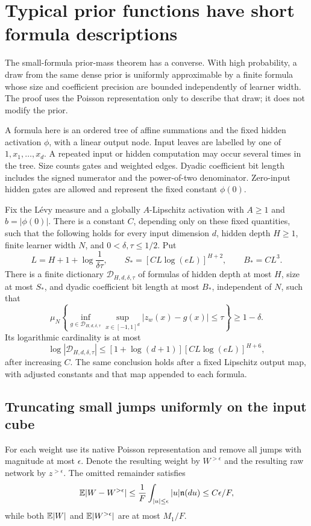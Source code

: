 \section{Typical prior functions have short formula descriptions}
\label{sec:levy-function-compression}
The small-formula prior-mass theorem has a converse. With high probability, a draw from the same dense prior is uniformly approximable by a finite formula whose size and coefficient precision are bounded independently of learner width. The proof uses the Poisson representation only to describe that draw; it does not modify the prior.

A formula here is an ordered tree of affine summations and the fixed hidden activation $\phi$, with a linear output node. Input leaves are labelled by one of $1,x_1,\ldots,x_d$. A repeated input or hidden computation may occur several times in the tree. Size counts gates and weighted edges. Dyadic coefficient bit length includes the signed numerator and the power-of-two denominator. Zero-input hidden gates are allowed and represent the fixed constant $\phi(0)$.

\begin{theorem}
\label{thm:levy-prior-compression}
Fix the L\'evy measure and a globally $A$-Lipschitz activation with $A\ge1$ and $b=|\phi(0)|$. There is a constant $C$, depending only on these fixed quantities, such that the following holds for every input dimension $d$, hidden depth $H\ge1$, finite learner width $N$, and $0<\delta,\tau\le1/2$. Put
\[
 L=H+1+\log\frac1{\delta\tau},\qquad
 S_*=[CL\log(eL)]^{H+2},\qquad B_*=CL^3.
\]
There is a finite dictionary $\mathcal D_{H,d,\delta,\tau}$ of formulas of hidden depth at most $H$, size at most $S_*$, and dyadic coefficient bit length at most $B_*$, independent of $N$, such that
\[
 \mu_N\left\{\inf_{g\in\mathcal D_{H,d,\delta,\tau}}
          \sup_{x\in[-1,1]^d}|z_w(x)-g(x)|\le\tau\right\}
 \ge1-\delta.
\]
Its logarithmic cardinality is at most
\[
 \log|\mathcal D_{H,d,\delta,\tau}|
       \le[1+\log(d+1)][CL\log(eL)]^{H+6},
\]
after increasing $C$. The same conclusion holds after a fixed Lipschitz output map, with adjusted constants and that map appended to each formula.
\end{theorem}

\subsection{Truncating small jumps uniformly on the input cube}
For each weight use its native Poisson representation and remove all jumps with magnitude at most $\epsilon$. Denote the resulting weight by $W^{>\epsilon}$ and the resulting raw network by $z^{>\epsilon}$. The omitted remainder satisfies
\[
 \mathbb E|W-W^{>\epsilon}|
 \le\frac1F\int_{|u|\le\epsilon}|u|\mathfrak n(du)
 \le C\epsilon/F,
\]
while both $\mathbb E|W|$ and $\mathbb E|W^{>\epsilon}|$ are at most $M_1/F$.


